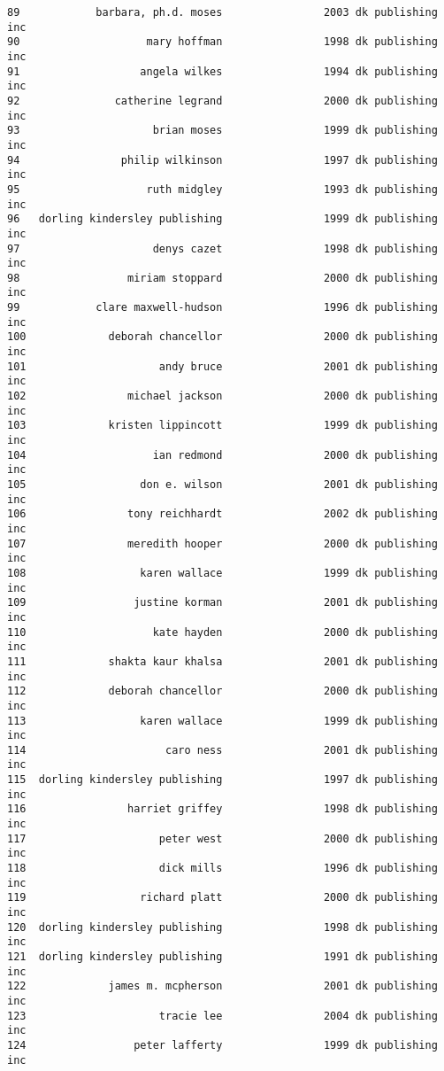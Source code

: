 \documentclass[
]{report}
\begin{document}
\begin{verbatim}
89            barbara, ph.d. moses                2003 dk publishing inc
90                    mary hoffman                1998 dk publishing inc
91                   angela wilkes                1994 dk publishing inc
92               catherine legrand                2000 dk publishing inc
93                     brian moses                1999 dk publishing inc
94                philip wilkinson                1997 dk publishing inc
95                    ruth midgley                1993 dk publishing inc
96   dorling kindersley publishing                1999 dk publishing inc
97                     denys cazet                1998 dk publishing inc
98                 miriam stoppard                2000 dk publishing inc
99            clare maxwell-hudson                1996 dk publishing inc
100             deborah chancellor                2000 dk publishing inc
101                     andy bruce                2001 dk publishing inc
102                michael jackson                2000 dk publishing inc
103             kristen lippincott                1999 dk publishing inc
104                    ian redmond                2000 dk publishing inc
105                  don e. wilson                2001 dk publishing inc
106                tony reichhardt                2002 dk publishing inc
107                meredith hooper                2000 dk publishing inc
108                  karen wallace                1999 dk publishing inc
109                 justine korman                2001 dk publishing inc
110                    kate hayden                2000 dk publishing inc
111             shakta kaur khalsa                2001 dk publishing inc
112             deborah chancellor                2000 dk publishing inc
113                  karen wallace                1999 dk publishing inc
114                      caro ness                2001 dk publishing inc
115  dorling kindersley publishing                1997 dk publishing inc
116                harriet griffey                1998 dk publishing inc
117                     peter west                2000 dk publishing inc
118                     dick mills                1996 dk publishing inc
119                  richard platt                2000 dk publishing inc
120  dorling kindersley publishing                1998 dk publishing inc
121  dorling kindersley publishing                1991 dk publishing inc
122             james m. mcpherson                2001 dk publishing inc
123                     tracie lee                2004 dk publishing inc
124                 peter lafferty                1999 dk publishing inc

\end{verbatim}
\end{document}
